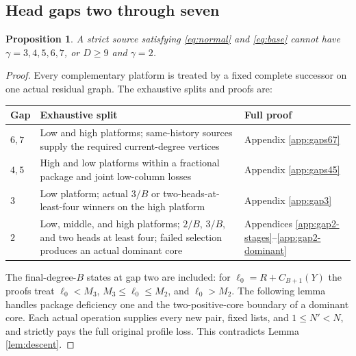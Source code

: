 \documentclass[11pt,a4paper]{article}
\newtheorem{proposition}[theorem]{Proposition}
\theoremstyle{definition}
\begin{document}
\subsection{Head gaps two through seven}
\begin{proposition}\label{prop:gap2to7}
A strict source satisfying \eqref{eq:normal} and \eqref{eq:base} cannot have
$\gamma=3,4,5,6,7$, or $D\ge9$ and $\gamma=2$.
\end{proposition}
\begin{proof}
Every complementary platform is treated by a fixed complete successor on one actual residual graph. The exhaustive splits and proofs are:
\begin{center}\small
\begin{tabular}{P{.14\textwidth}P{.58\textwidth}P{.17\textwidth}}
\toprule
Gap & Exhaustive split & Full proof\\\midrule
$6,7$ & Low and high platforms; same-history sources supply the required current-degree vertices & Appendix \ref{app:gaps67}\\
$4,5$ & High and low platforms within a fractional package and joint low-column losses & Appendix \ref{app:gaps45}\\
$3$ & Low platform; actual $3/B$ or two-heads-at-least-four winners on the high platform & Appendix \ref{app:gap3}\\
$2$ & Low, middle, and high platforms; $2/B$, $3/B$, and two heads at least four; failed selection produces an actual dominant core & Appendices \ref{app:gap2-stages}--\ref{app:gap2-dominant}\\
\bottomrule
\end{tabular}
\end{center}
The final-degree-$B$ states at gap two are included: for $\ell_0=R+C_{B+1}(Y)$ the proofs treat $\ell_0<M_3$, $M_3\le\ell_0\le M_2$, and $\ell_0>M_2$. The following lemma handles package deficiency one and the two-positive-core boundary of a dominant core. Each actual operation supplies every new pair, fixed lists, and $1\le N'<N$, and strictly pays the full original profile loss. This contradicts Lemma \ref{lem:descent}.
\end{proof}
\end{document}
